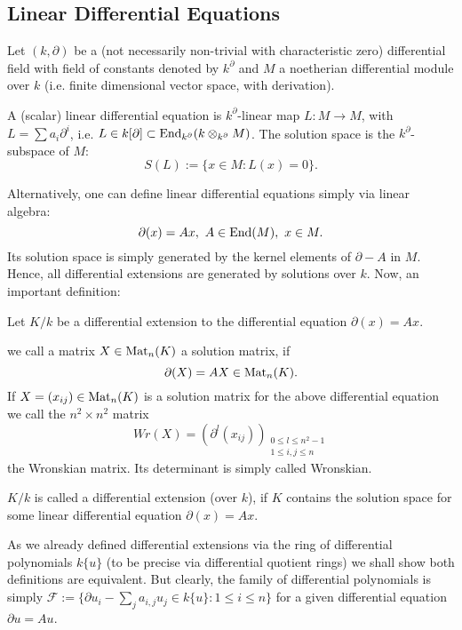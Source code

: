 \subsection{Linear Differential Equations}
Let $(k,\partial)$ be a (not necessarily non-trivial with characteristic zero) differential field with field of constants denoted by $k^\partial$ and $M$ a noetherian differential module over $k$ (i.e. finite dimensional vector space, with derivation).
\begin{defi}
A (scalar) linear differential equation is $k^\partial$-linear map $L : M \longrightarrow M$, with $L = \sum a_i \partial^i$, i.e. $L \in k[\partial] \subset \mathrm{End}_{k^\partial}(k \otimes_{k^\partial} M)$. The solution space is the $k^\partial$-subspace of $M$:
$$S(L) := \{x \in M : L(x) = 0\}.$$
\end{defi}
Alternatively, one can define linear differential equations simply via linear algebra:
$$\partial(x) = A x,\ A \in \mathrm{End}(M),\ x \in M.$$
Its solution space is simply generated by the kernel elements of $\partial - A$ in $M$. Hence, all differential extensions are generated by solutions over $k$. Now, an important definition:
\begin{defi}
Let $K/k$ be a differential extension to the differential equation $\partial(x) = Ax$.
\bn
\item we call a matrix $X \in \mathrm{Mat}_n(K)$ a solution matrix, if
$$\partial(X) = A X \in \mathrm{Mat}_n(K).$$
If $X = (x_{ij}) \in \mathrm{Mat}_n(K)$ is a solution matrix for the above differential equation we call the $n^2 \times n^2$ matrix
$$Wr(X) = \left(\partial^l(x_{ij})\right)_{\substack{0 \leq l \leq n^2-1\\1 \leq i,j \leq n}}$$
the Wronskian matrix. Its determinant is simply called Wronskian.
\item $K/k$ is called a differential extension (over $k$), if $K$ contains the solution space for some linear differential equation $\partial(x) = A x$.
\en
\end{defi}
\bmk As we already defined differential extensions via the ring of differential polynomials $k\{u\}$ (to be precise via differential quotient rings) we shall show both definitions are equivalent. But clearly, the family of differential polynomials is simply $\mathcal{F} := \{\partial u_i - \sum_j a_{i,j} u_j \in k\{u\} : 1 \leq i \leq n\}$ for a given differential equation $\partial u = A u$.\\
